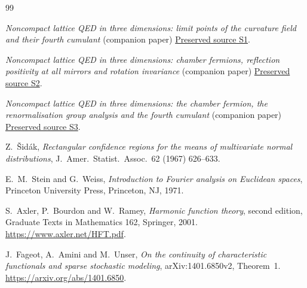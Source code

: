 \documentclass[11pt]{amsart}
\theoremstyle{definition}
\begin{document}
\begin{thebibliography}{99}

\emph{Noncompact lattice QED in three dimensions: limit points of the curvature field
and their fourth cumulant} (companion paper) \href{https://github.com/ethanwsussman/Yang--Mills-LLM-experiment/blob/main/QED3/S1.tex}{Preserved source S1}.

\emph{Noncompact lattice QED in three dimensions: chamber fermions,
reflection positivity at all mirrors and rotation invariance} (companion paper) \href{https://github.com/ethanwsussman/Yang--Mills-LLM-experiment/blob/main/QED3/Infinite-lattice%20reflection%20positivity%20%28LP1%29/ChamberQED.pdf}{Preserved source S2}.

\emph{Noncompact lattice QED in three dimensions: the chamber fermion,
the renormalisation group analysis and the fourth cumulant} (companion paper) \href{https://github.com/ethanwsussman/Yang--Mills-LLM-experiment/blob/main/QED3/S3.tex}{Preserved source S3}.

Z.~\v{S}id\'ak, \emph{Rectangular confidence regions for the means of multivariate normal distributions}, J.\ Amer.\ Statist.\ Assoc.\ 62 (1967) 626--633.

E.~M.~Stein and G.~Weiss, \emph{Introduction to Fourier analysis on Euclidean spaces},
Princeton University Press, Princeton, NJ, 1971.

S.~Axler, P.~Bourdon and W.~Ramey, \emph{Harmonic function theory},
second edition, Graduate Texts in Mathematics 162, Springer, 2001.
\url{https://www.axler.net/HFT.pdf}.


J.~Fageot, A.~Amini and M.~Unser,
\emph{On the continuity of characteristic functionals and sparse stochastic modeling},
arXiv:1401.6850v2, Theorem~1.
\url{https://arxiv.org/abs/1401.6850}.

\end{thebibliography}
\end{document}

